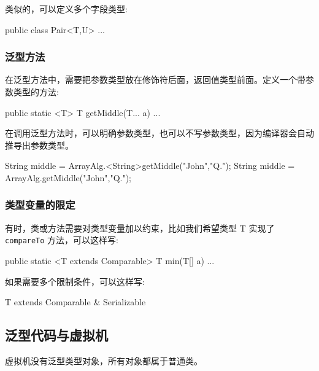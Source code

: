 类似的，可以定义多个字段类型:

\begin{Java}
public class Pair<T,U> {...}
\end{Java}


\subsubsection{泛型方法}

在泛型方法中，需要把参数类型放在修饰符后面，返回值类型前面。定义一个带参数类型的方法:

\begin{Java}
public static <T> T getMiddle(T... a) {...}
\end{Java}

在调用泛型方法时，可以明确参数类型，也可以不写参数类型，因为编译器会自动推导出参数类型。

\begin{Java}
String middle = ArrayAlg.<String>getMiddle("John","Q.");
String middle = ArrayAlg.getMiddle("John","Q.");
\end{Java}

\subsubsection{类型变量的限定}

有时，类或方法需要对类型变量加以约束，比如我们希望类型 T 实现了 \texttt{compareTo} 方法，可以这样写:

\begin{Java}
public static <T extends Comparable> T min(T[] a) ...
\end{Java}

如果需要多个限制条件，可以这样写:

\begin{Java}
T extends Comparable & Serializable
\end{Java}

\subsection{泛型代码与虚拟机}

虚拟机没有泛型类型对象，所有对象都属于普通类。

